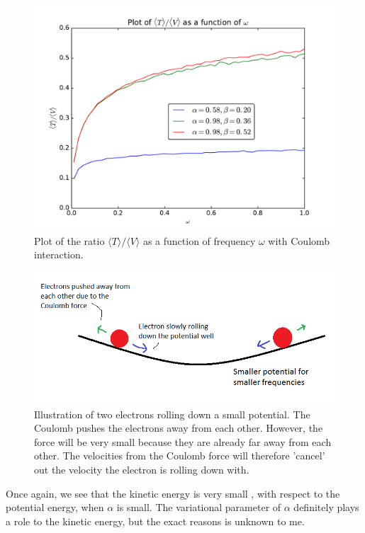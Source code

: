\documentclass[12pt]{article}
\begin{document}
\begin{figure}[h]
\centering
\includegraphics[width=\linewidth]{Plots/Virial_Plot.pdf}
\caption{Plot of the ratio $\langle T \rangle / \langle V \rangle$ as a function of frequency $\omega$ with Coulomb interaction.}
\label{fig:Virial_Plot}
\end{figure}


\begin{figure}[h]
\centering
\includegraphics[width=\linewidth]{Virial-example.png}
\caption{Illustration of two electrons rolling down a small potential. The Coulomb pushes the electrons away from each other. However, the force will be very small because they are already far away from each other. The velocities from the Coulomb force will therefore 'cancel' out the velocity the electron is rolling down with.}
\label{fig:Virial_Example}
\end{figure}

Once again, we see that the kinetic energy is very small , with respect to the potential energy, when $\alpha$ is small. The variational parameter of $\alpha$ definitely plays a role to the kinetic energy, but the exact reasons is unknown to me.
\end{document}
